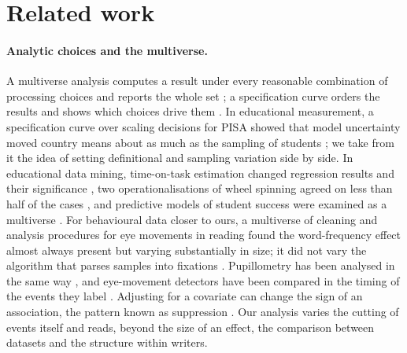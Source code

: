 \section{Related work}
\label{sec:related}

\paragraph{Analytic choices and the multiverse.} A multiverse analysis computes a result under every reasonable
combination of processing choices and reports the whole set \cite{steegen2016multiverse}; a specification curve orders
the results and shows which choices drive them \cite{simonsohn2020specification}. In educational measurement, a
specification curve over scaling decisions for PISA showed that model uncertainty moved country means about as much as
the sampling of students \cite{robitzsch2022multiverse}; we take from it the idea of setting definitional and sampling
variation side by side. In educational data mining, time-on-task estimation changed regression results and their
significance \cite{kovanovic2015time}, two operationalisations of wheel spinning agreed on less than half of the cases
\cite{zhang2019wheel}, and predictive models of student success were examined as a multiverse
\cite{tang2025multiverse}. For behavioural data closer to ours, a multiverse of cleaning and analysis procedures for
eye movements in reading found the word-frequency effect almost always present but varying substantially in size; it
did not vary the algorithm that parses samples into fixations \cite{godwin2025multiverse}. Pupillometry has been
analysed in the same way \cite{calignano2023pupillometry}, and eye-movement detectors have been compared in the timing
of the events they label \cite{nir2026systematic}. Adjusting for a covariate can change the sign of an association, the
pattern known as suppression \cite{mackinnon2000equivalence}. Our analysis varies the cutting of events itself and
reads, beyond the size of an effect, the comparison between datasets and the structure within writers.

